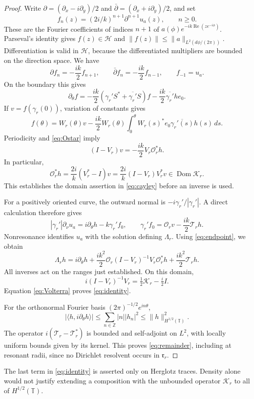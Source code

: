 \documentclass[11pt]{amsart}
\numberwithin{equation}{section}
\newcommand{\T}{\mathbb T}
\newcommand{\Hh}{\mathcal H}
\newcommand{\Id}{I}
\newcommand{\Dom}{\operatorname{Dom}}
\newcommand{\ip}[2]{\langle #1,#2\rangle}
\newcommand{\norm}[1]{\lVert #1\rVert}
\newcommand{\OO}{\mathcal O}
\newcommand{\VV}{\mathcal T}
\newcommand{\KK}{\mathcal K}
\begin{document}
\begin{proof}
Write $\partial=(\partial_x-i\partial_y)/2$ and
$\bar\partial=(\partial_x+i\partial_y)/2$, and set
\[
 f_n(z)=(2i/k)^{n+1}\partial^{n+1}u_a(z),\qquad n\ge0.
\]
These are the Fourier coefficients of indices $n+1$ of
$a(\phi)e^{-ik\operatorname{Re}(ze^{-i\phi})}$.
Parseval's identity gives $f(z)\in\Hh$ and
$\norm{f(z)}\le\norm a_{L^2(d\phi/(2\pi))}$.
Differentiation is valid in $\Hh$, because the differentiated
multipliers are bounded on the direction space. We have
\[
 \partial f_n=-\frac{ik}{2}f_{n+1},\qquad
 \bar\partial f_n=-\frac{ik}{2}f_{n-1},\qquad f_{-1}=u_a.
\]
On the boundary this gives
\[
 \partial_\theta f=-\frac{ik}{2}
       (\gamma_r'S^*+\overline{\gamma_r'}S)f
       -\frac{ik}{2}\overline{\gamma_r'}h e_0.
\]
If $v=f(\gamma_r(0))$, variation of constants gives
\[
 f(\theta)=W_r(\theta)v-\frac{ik}{2}W_r(\theta)
       \int_0^\theta W_r(s)^*e_0\overline{\gamma_r'(s)}h(s)\,ds.
\]
Periodicity and \eqref{eq:Ostar} imply
\begin{equation}\label{eq:endpoint}
 (\Id-V_r)v=-\frac{ik}{2}V_r\OO_r^*h.
\end{equation}
In particular,
\[
 \OO_r^*h=\frac{2i}{k}(V_r^*-\Id)v
       =\frac{2i}{k}(\Id-V_r)V_r^*v\in\Dom\KK_r.
\]
This establishes the domain assertion in \eqref{eq:cayley} before an inverse is used.

For a positively oriented curve, the outward normal is
$-i\gamma_r'/|\gamma_r'|$. A direct calculation therefore gives
\[
 |\gamma_r'|\partial_\nu u_a=i\partial_\theta h-k\gamma_r'f_0,
 \qquad \gamma_r'f_0=\OO_rv-\frac{ik}{2}\VV_rh.
\]
Nonresonance identifies $u_a$ with the solution defining $\Lambda_r$.
Using \eqref{eq:endpoint}, we obtain
\[
 \Lambda_rh=i\partial_\theta h
       +\frac{ik^2}{2}\OO_r(\Id-V_r)^{-1}V_r\OO_r^*h
       +\frac{ik^2}{2}\VV_rh.
\]
All inverses act on the ranges just established. On this domain,
\[
 i(\Id-V_r)^{-1}V_r=\tfrac12\KK_r-\tfrac i2\Id.
\]
Equation \eqref{eq:Volterra} proves \eqref{eq:identity}.

For the orthonormal Fourier basis $(2\pi)^{-1/2}e^{in\theta}$,
\[
 |\ip h{i\partial_\theta h}|
 \le\sum_{n\in\mathbb Z}|n||h_n|^2
 \le\norm h_{H^{1/2}(\T)}^2.
\]
The operator $i(\VV_r-\VV_r^*)$ is bounded and self-adjoint on
$L^2$, with locally uniform bounds given by its kernel.
This proves \eqref{eq:remainder}, including at resonant radii,
since no Dirichlet resolvent occurs in $\mathfrak r_r$.
\end{proof}

The last term in \eqref{eq:identity} is asserted only on Herglotz
traces. Density alone would not justify extending a composition
with the unbounded operator $\KK_r$ to all of $H^{1/2}(\T)$.
\end{document}
